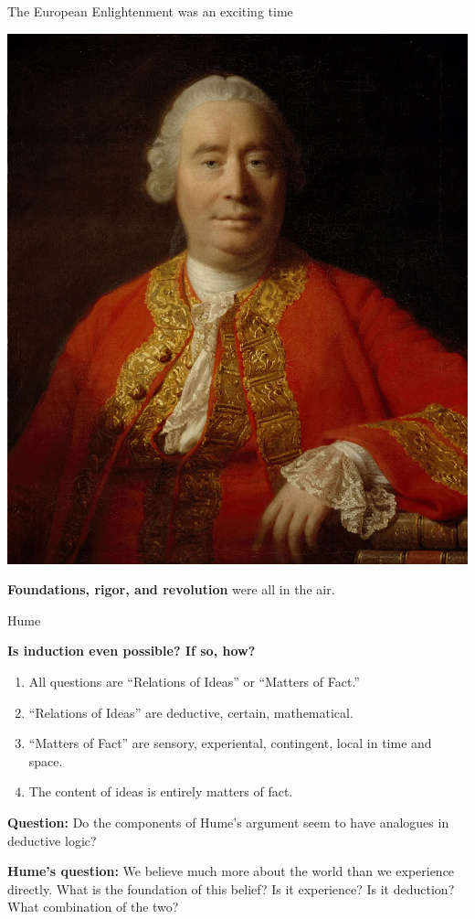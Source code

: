 \documentclass[8pt]{beamer}\usepackage[]{graphicx}\usepackage[]{color}
\begin{document}
\begin{frame}{The European Enlightenment was an exciting time}
\begin{minipage}{0.35 \textwidth}
\includegraphics[width=0.9 \textwidth]{Hume.png}
\end{minipage}
%
\pause
\textbf{Foundations, rigor, and revolution} were all in the air.


\end{frame}


\begin{frame}{Hume}

\textbf{Is induction even possible?  If so, how?}
%
\begin{enumerate}
%
\item All questions are ``Relations of Ideas'' or ``Matters of Fact.''
\item ``Relations of Ideas'' are deductive, certain, mathematical.
\item ``Matters of Fact'' are sensory, experiental, contingent, local
in time and space.
\item The content of ideas is entirely matters of fact.
%
\end{enumerate}
%
\pause \textbf{Question: }Do the components of Hume's argument seem to have
analogues in deductive logic?

\pause

\textbf{Hume's question:} We believe much more about the world than we
experience directly.  What is the foundation of this belief?  Is it
experience?  Is it deduction?  What combination of the two?

\end{frame}
\end{document}
